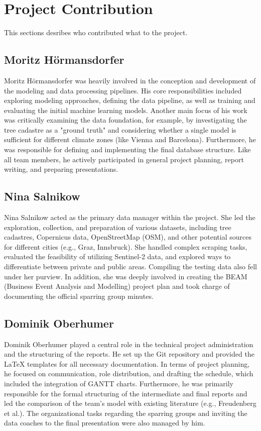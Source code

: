 \section{Project Contribution}

This sections desribes who contributed what to the project.

\subsection*{Moritz Hörmansdorfer}
Moritz Hörmansdorfer was heavily involved in the conception and development of the modeling and data processing pipelines. His core responsibilities included exploring modeling approaches, defining the data pipeline, as well as training and evaluating the initial machine learning models. Another main focus of his work was critically examining the data foundation, for example, by investigating the tree cadastre as a "ground truth" and considering whether a single model is sufficient for different climate zones (like Vienna and Barcelona). Furthermore, he was responsible for defining and implementing the final database structure. Like all team members, he actively participated in general project planning, report writing, and preparing presentations.

\subsection*{Nina Salnikow}
Nina Salnikow acted as the primary data manager within the project. She led the exploration, collection, and preparation of various datasets, including tree cadastres, Copernicus data, OpenStreetMap (OSM), and other potential sources for different cities (e.g., Graz, Innsbruck). She handled complex scraping tasks, evaluated the feasibility of utilizing Sentinel-2 data, and explored ways to differentiate between private and public areas. Compiling the testing data also fell under her purview. In addition, she was deeply involved in creating the BEAM (Business Event Analysis and Modelling) project plan and took charge of documenting the official sparring group minutes.

\subsection*{Dominik Oberhumer}
Dominik Oberhumer played a central role in the technical project administration and the structuring of the reports. He set up the Git repository and provided the LaTeX templates for all necessary documentation. In terms of project planning, he focused on communication, role distribution, and drafting the schedule, which included the integration of GANTT charts. Furthermore, he was primarily responsible for the formal structuring of the intermediate and final reports and led the comparison of the team's model with existing literature (e.g., Freudenberg et al.). The organizational tasks regarding the sparring groups and inviting the data coaches to the final presentation were also managed by him.

